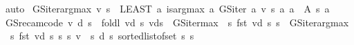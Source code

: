 \begin{isabellebody}
\ auto%
\endisatagproof
{\isafoldproof}%
%
\isadelimproof
\isanewline
%
\endisadelimproof
\isanewline
{}\isamarkupfalse%
\ {\isachardoublequoteopen}GS{\isacharunderscore}{\kern0pt}iter{\isacharunderscore}{\kern0pt}arg{\isacharunderscore}{\kern0pt}max\ v\ s\ {\isacharequal}{\kern0pt}\ {\isacharparenleft}{\kern0pt}LEAST\ a{\isachardot}{\kern0pt}\ is{\isacharunderscore}{\kern0pt}arg{\isacharunderscore}{\kern0pt}max\ {\isacharparenleft}{\kern0pt}{\isasymlambda}a{\isachardot}{\kern0pt}\ GS{\isacharunderscore}{\kern0pt}iter\ a\ v\ s{\isacharparenright}{\kern0pt}\ {\isacharparenleft}{\kern0pt}{\isasymlambda}a{\isachardot}{\kern0pt}\ a\ {\isasymin}\ A\ s{\isacharparenright}{\kern0pt}\ a{\isacharparenright}{\kern0pt}{\isachardoublequoteclose}\isanewline
\isanewline
{}\isamarkupfalse%
\ {\isachardoublequoteopen}GS{\isacharunderscore}{\kern0pt}rec{\isacharunderscore}{\kern0pt}am{\isacharunderscore}{\kern0pt}code\ v\ d\ s\ {\isacharequal}{\kern0pt}\ foldl\ {\isacharparenleft}{\kern0pt}{\isasymlambda}vd\ s{\isachardot}{\kern0pt}\ vd{\isacharparenleft}{\kern0pt}s\ {\isacharcolon}{\kern0pt}{\isacharequal}{\kern0pt}\ {\isacharparenleft}{\kern0pt}GS{\isacharunderscore}{\kern0pt}iter{\isacharunderscore}{\kern0pt}max\ {\isacharparenleft}{\kern0pt}{\isasymchi}\ s{\isachardot}{\kern0pt}\ fst\ {\isacharparenleft}{\kern0pt}vd\ s{\isacharparenright}{\kern0pt}{\isacharparenright}{\kern0pt}\ s{\isacharcomma}{\kern0pt}\ \ GS{\isacharunderscore}{\kern0pt}iter{\isacharunderscore}{\kern0pt}arg{\isacharunderscore}{\kern0pt}max\ {\isacharparenleft}{\kern0pt}{\isasymchi}\ s{\isachardot}{\kern0pt}\ fst\ {\isacharparenleft}{\kern0pt}vd\ s{\isacharparenright}{\kern0pt}{\isacharparenright}{\kern0pt}\ s{\isacharparenright}{\kern0pt}{\isacharparenright}{\kern0pt}{\isacharparenright}{\kern0pt}\ {\isacharparenleft}{\kern0pt}{\isasymlambda}s{\isachardot}{\kern0pt}\ {\isacharparenleft}{\kern0pt}v\ {\isachardollar}{\kern0pt}\ s{\isacharcomma}{\kern0pt}\ d\ s{\isacharparenright}{\kern0pt}{\isacharparenright}{\kern0pt}\ {\isacharparenleft}{\kern0pt}sorted{\isacharunderscore}{\kern0pt}list{\isacharunderscore}{\kern0pt}of{\isacharunderscore}{\kern0pt}set\ {\isacharbraceleft}{\kern0pt}{\isachardot}{\kern0pt}{\isachardot}{\kern0pt}s{\isacharbraceright}{\kern0pt}{\isacharparenright}{\kern0pt}\ s{\isachardoublequoteclose}\isanewline
{}\isamarkupfalse%

\end{isabellebody}
